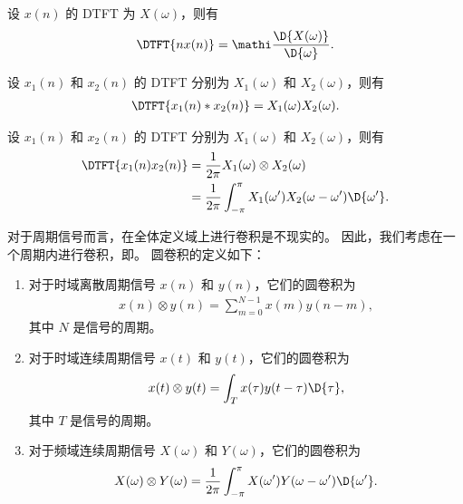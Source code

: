 \begin{property}
    设 $x(n)$ 的 DTFT 为 $X(\omega)$，则有
    \begin{align*}
        \DTFT{n x(n)} = \mathi\frac{\D{X(\omega)}}{\D{\omega}}.
    \end{align*}
\end{property}

\begin{property}
    设 $x_1(n)$ 和 $x_2(n)$ 的 DTFT 分别为 $X_1(\omega)$ 和 $X_2(\omega)$，则有
    \begin{align*}
        \DTFT{x_1(n) * x_2(n)} = X_1(\omega)X_2(\omega).
    \end{align*}
\end{property}

\begin{property}
    设 $x_1(n)$ 和 $x_2(n)$ 的 DTFT 分别为 $X_1(\omega)$ 和 $X_2(\omega)$，则有
    \begin{align*}
        \DTFT{x_1(n)x_2(n)} & = \frac{1}{2\pi}X_1(\omega) \otimes X_2(\omega) \\
        & = \frac{1}{2\pi}\int_{-\pi}^{\pi}X_1(\omega')X_2(\omega - \omega')\D{\omega'}.
    \end{align*}
\end{property}

\begin{definition}[圆卷积]
    对于周期信号而言，在全体定义域上进行卷积是不现实的。
    因此，我们考虑在一个周期内进行卷积，即。
    圆卷积的定义如下：
    \begin{enumerate}
        \item 对于时域离散周期信号 $x(n)$ 和 $y(n)$，它们的圆卷积为
            \begin{align*}
                x(n) \otimes y(n) = \sum_{m = 0}^{N-1}x(m)y(n - m),
            \end{align*}
            其中 $N$ 是信号的周期。
        \item 对于时域连续周期信号 $x(t)$ 和 $y(t)$，它们的圆卷积为
            \begin{align*}
                x(t) \otimes y(t) = \int_{T}x(\tau)y(t - \tau)\D{\tau},
            \end{align*}
            其中 $T$ 是信号的周期。
        \item 对于频域连续周期信号 $X(\omega)$ 和 $Y(\omega)$，它们的圆卷积为
            \begin{align*}
                X(\omega) \otimes Y(\omega) = \frac{1}{2\pi}\int_{-\pi}^{\pi}X(\omega')Y(\omega - \omega')\D{\omega'}.
            \end{align*}
    \end{enumerate}
\end{definition}

